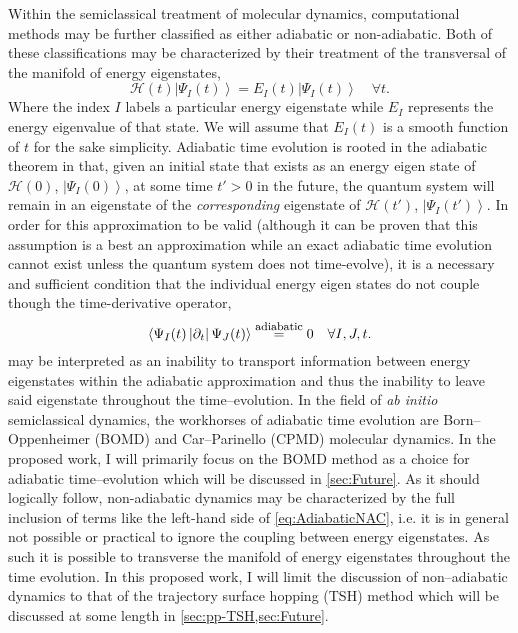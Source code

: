 \documentclass[12pt]{article}
\newcommand{\ket}[1]{\left\vert #1 \right\rangle}         %
\newcommand{\innerop}[3]{\left\langle #1 \left\vert #2 \right\vert #3 \right\rangle}  %
\begin{document}
Within the semiclassical treatment of molecular dynamics, computational methods
may be further classified as either adiabatic or non-adiabatic. Both of these
classifications may be characterized by their treatment of the transversal of
the manifold of energy eigenstates,
\begin{equation}
\mathscr{H}(t) \ket{\Psi_I (t)} = E_I(t) \ket{\Psi_I (t)}
\quad \forall t.
\label{eq:EnergyEig}
\end{equation}
Where the index $I$ labels a particular energy eigenstate while $E_I$ represents
the energy eigenvalue of that state. We will assume that $E_I(t)$ is a smooth
function of $t$ for the sake simplicity. Adiabatic time evolution is rooted in
the adiabatic theorem in that, given an initial state that exists as an energy
eigen state of $\mathscr{H}(0)$, $\ket{\Psi_I(0)}$, at some time $t' > 0$ in the
future, the quantum system will remain in an eigenstate of the
\emph{corresponding} eigenstate of $\mathscr{H}(t')$, $\ket{\Psi_I(t')}$. In
order for this approximation to be valid (although it can be proven that this
assumption is a best an approximation while an exact adiabatic time evolution
cannot exist unless the quantum system does not time-evolve), it is a
necessary and sufficient condition that the individual energy eigen states do
not couple though the time-derivative operator,
\begin{equation}
\innerop{\Psi_I(t)}{\partial_t}{\Psi_J (t)}
  \stackrel{\mathrm{\mbox{\footnotesize adiabatic}}}{=} 0
  \quad \forall I,J,t.
  \label{eq:AdiabaticNAC}
\end{equation}
 may be interpreted as an inability to transport
information between energy eigenstates within the adiabatic approximation and
thus the inability to leave said eigenstate throughout the time--evolution.  In
the field of \emph{ab initio} semiclassical dynamics, the workhorses of
adiabatic time evolution are Born--Oppenheimer  (BOMD) and Car--Parinello (CPMD)
molecular dynamics. In the proposed work, I will primarily focus on the BOMD
method as a choice for adiabatic time--evolution which will be discussed in
\cref{sec:Future}.  As it should logically follow, non-adiabatic dynamics may be
characterized by the full inclusion of terms like the left-hand side of
\cref{eq:AdiabaticNAC}, i.e.  it is in general not possible or practical to
ignore the coupling between energy eigenstates. As such it is possible to
transverse the manifold of energy eigenstates throughout the time evolution.
In this proposed work, I will limit the discussion of non--adiabatic dynamics to
that of the trajectory surface hopping (TSH) method which will be discussed at
some length in \cref{sec:pp-TSH,sec:Future}.
\end{document}
